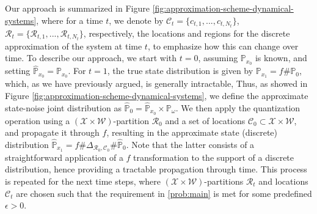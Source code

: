 \documentclass[11pt, a4paper, oneside,reqno]{amsart}
\theoremstyle{plain}
\def\prob{\mathbb{P}}
\def\probHat{\hat{\mathbb{P}}}
\def\wasserstein{{\mathbb{W}}}
\def\sR{{\mathcal{R}}}
\def\sW{{\mathcal{W}}}
\def\sX{{\mathcal{X}}}
\def\bsR{{\bm{\mathcal{R}}}}
\def\bsC{{\bm{\mathcal{C}}}}
\begin{document}
Our approach is summarized in Figure \ref{fig:approximation-scheme-dynamical-systems}, where for a time $t$, we denote by  $\bsC_t = \{ c_{t,1}, ..., c_{t, N_t} \}$, $\bsR_t = \{ \sR_{t, 1},...,\sR_{t, N_t} \}$, respectively, the locations and regions for the discrete approximation of the system at time $t$, to emphasize how this can change over time. 
To describe our approach, we start with $t=0$, assuming $\prob_{x_0}$ is known, and setting $\probHat_{x_0} = \prob_{x_0}$.
For $t=1$, 
the true state distribution is given by $\prob_{x_1} = f\#\prob_0$, which, as we have previously argued, is generally intractable, 
Thus, as showed in Figure \ref{fig:approximation-scheme-dynamical-systems}, we define the approximate state-noise joint distribution as $\probHat_0 = \probHat_{x_{0}} \times \prob_\omega$. 
We then apply the quantization operation using a $(\sX \times \sW)$-partition $\bsR_0$ and a set of locations $\bsC_0 \subset \sX \times \sW$, and propagate it through $f$, resulting in the approximate state (discrete) distribution $\probHat_{x_1} = f\#\Delta_{\bsR_0, \bsC_0}\#\probHat_0$.
Note that the latter consists of a straightforward application of a $f$ transformation to the support of a discrete distribution, hence providing a tractable propagation through time. This process is repeated for the next time steps, where $(\sX \times \sW)$-partitions $\bsR_t$ and locations $\bsC_t$ are chosen such that the requirement in \eqref{prob:main} is met for some predefined $\epsilon>0$. 
\end{document}

